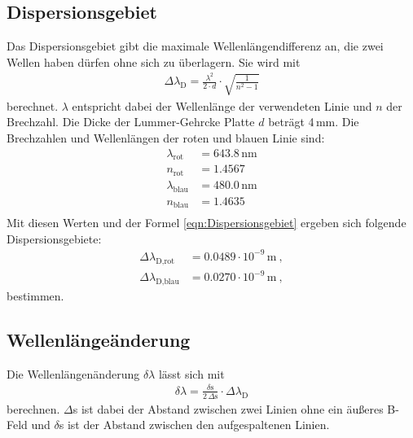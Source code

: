 \subsection{Dispersionsgebiet}
Das Dispersionsgebiet gibt die maximale Wellenlängendifferenz an, die zwei Wellen haben dürfen ohne sich zu überlagern. Sie wird mit
\begin{align}
  \Delta\lambda_\text{D} = \frac{\lambda^2}{2\cdot d} \cdot \sqrt{\frac{1}{n^2 - 1}}
  \label{eqn:Dispersionsgebiet}
\end{align}
berechnet. $\lambda$ entspricht dabei der Wellenlänge der verwendeten Linie und $n$ der Brechzahl. Die Dicke der Lummer-Gehrcke Platte $d$ beträgt 4\,mm. Die Brechzahlen und Wellenlängen der roten und blauen Linie sind:
\begin{align*}
  \lambda_\text{rot} &= 643.8\,\text{nm} \\
  n_\text{rot} &= 1.4567 \\
  \lambda_\text{blau} &= 480.0\,\text{nm} \\
  n_\text{blau} &= 1.4635 \\
\end{align*}
Mit diesen Werten und der Formel \eqref{eqn:Dispersionsgebiet} ergeben sich folgende Dispersionsgebiete:
\begin{align*}
  \Delta\lambda_\text{D,rot} &= 0.0489 \cdot 10^{-9}\,\text{m}\ , \\
  \Delta\lambda_\text{D,blau} &= 0.0270 \cdot 10^{-9}\,\text{m}\ ,
\end{align*}
bestimmen.


\subsection{Wellenlängeänderung}
Die Wellenlängenänderung $\delta\lambda$ lässt sich mit
\begin{align}
  \delta\lambda = \frac{\delta\text{s}}{2\,\Delta\text{s}}\cdot \Delta\lambda_\text{D}
  \label{eqn:Verschiebung}
\end{align}
berechnen. $\Delta$s ist dabei der Abstand zwischen zwei Linien ohne ein äußeres B-Feld und $\delta$s ist der Abstand zwischen den aufgespaltenen Linien.



